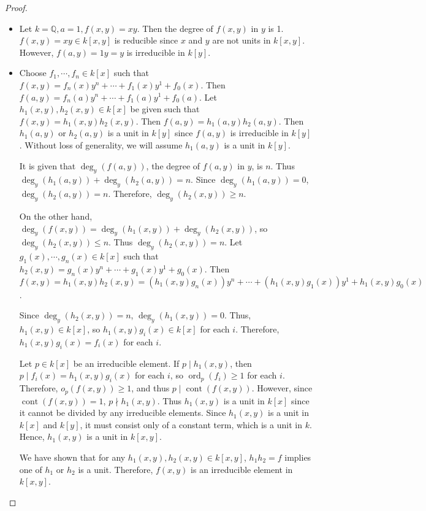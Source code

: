 \documentclass[12pt, psamsfonts]{amsart}
\theoremstyle{definition}
\theoremstyle{remark}
\DeclareMathOperator{\ord}{ord}
\DeclareMathOperator{\cont}{cont}
\numberwithin{equation}{section}
\begin{document}
\begin{proof}
  $ $
  \begin{itemize}
    \item
      Let $k = \mathbb{Q}, a = 1, f(x, y) = xy$.
      Then the degree of $f(x, y)$ in $y$ is 1.
      $f(x, y) = xy \in k[x, y]$ is reducible since $x$ and $y$ are not units in $k[x, y]$.
      However, $f(a, y) = 1y = y$ is irreducible in $k[y]$.
    \item
      Choose $f_1, \cdots, f_n \in k[x]$ such that $f(x, y) = f_n(x)y^n + \cdots + f_1(x)y^1 + f_0(x)$.
      Then $f(a, y) = f_n(a)y^n + \cdots + f_1(a)y^1 + f_0(a)$.
      Let $h_1(x, y), h_2(x, y) \in k[x]$ be given such that $f(x, y) = h_1(x, y)h_2(x, y)$.
      Then $f(a, y) = h_1(a, y)h_2(a, y)$.
      Then $h_1(a, y)$ or $h_2(a, y)$ is a unit in $k[y]$ since $f(a, y)$ is irreducible in $k[y]$.
      Without loss of generality, we will assume $h_1(a, y)$ is a unit in $k[y]$.

      It is given that $\deg_y(f(a, y))$, the degree of $f(a, y)$ in $y$, is $n$.
      Thus $\deg_y(h_1(a, y)) + \deg_y(h_2(a, y)) = n$.
      Since $\deg_y(h_1(a, y)) = 0$, $\deg_y(h_2(a, y)) = n$.
      Therefore, $\deg_y(h_2(x, y)) \geq n$.

      On the other hand, $\deg_y(f(x, y)) = \deg_y(h_1(x, y)) + \deg_y(h_2(x, y))$, so $\deg_y(h_2(x, y)) \leq n$.
      Thus $\deg_y(h_2(x, y)) = n$.
      Let $g_1(x), \cdots, g_n(x) \in k[x]$ such that $h_2(x, y) = g_n(x)y^n + \cdots + g_1(x)y^1 + g_0(x)$.
      Then $f(x, y) = h_1(x, y)h_2(x, y) = (h_1(x, y)g_n(x))y^n + \cdots + (h_1(x, y)g_1(x))y^1 + h_1(x, y)g_0(x)$.

      Since $\deg_y(h_2(x, y)) = n$, $\deg_y(h_1(x, y)) = 0$.
      Thus, $h_1(x, y) \in k[x]$, so $h_1(x, y)g_i(x) \in k[x]$ for each $i$.
      Therefore, $h_1(x, y)g_i(x) = f_i(x)$ for each $i$.

      Let $p \in k[x]$ be an irreducible element.
      If $p \mid h_1(x, y)$, then $p \mid f_i(x) = h_1(x, y)g_i(x)$ for each $i$, so $\ord_p(f_i) \geq 1$ for each $i$.
      Therefore, $o_p(f(x, y)) \geq 1$, and thus $p \mid \cont(f(x, y))$.
      However, since $\cont(f(x, y)) = 1$, $p \nmid h_1(x, y)$.
      Thus $h_1(x, y)$ is a unit in $k[x]$ since it cannot be divided by any irreducible elements.
      Since $h_1(x, y)$ is a unit in $k[x]$ and $k[y]$, it must consist only of a constant term, which is a unit in $k$.
      Hence, $h_1(x, y)$ is a unit in $k[x, y]$.
      
      We have shown that for any $h_1(x, y), h_2(x, y) \in k[x, y]$, $h_1h_2 = f$ implies one of $h_1$ or $h_2$ is a unit.
      Therefore, $f(x, y)$ is an irreducible element in $k[x, y]$.


\end{itemize}
\end{proof}
\end{document}
